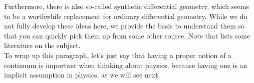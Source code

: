 Furthermore, there is also so-called synthetic differential geometry, which seems to be a worthwhile replacement for ordinary differential geometry.
While we do not fully develop these ideas here, we provide the basis to understand them so that you can quickly pick them up from some other source.
Note that \cite{wiki-nlab0000} lists some literature on the subject.
\\
To wrap up this paragraph, let's just say that having a proper notion of a continuum is important when thinking about physics, because having one is an implicit assumption in physics, as we will see next.

